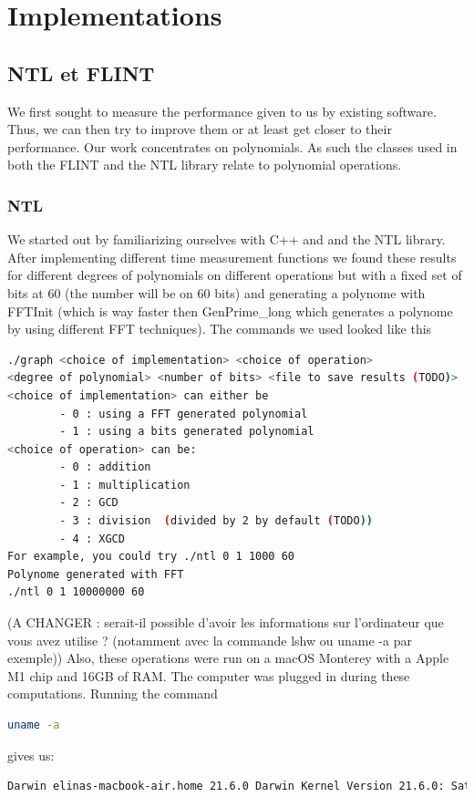 \newpage
\section{Implementations}
\subsection{NTL et FLINT}
We first sought to measure the performance given to us by existing software. Thus, we can then try to improve them or at least get closer to their performance.
Our work concentrates on polynomials. As such the classes used in both the FLINT and the NTL library relate to polynomial operations.
\subsubsection{NTL}

We started out by familiarizing ourselves with C++ and and the NTL library.
After implementing different time measurement functions we found these results for different degrees of polynomials on different operations but with a fixed set of bits at 60 (the number will be on 60 bits) and generating a polynome with FFTInit (which is way faster then GenPrime\_long which generates a polynome by using different FFT techniques).
The commands we used looked like this 
\begin{lstlisting}[language=bash]
./graph <choice of implementation> <choice of operation> 
<degree of polynomial> <number of bits> <file to save results (TODO)>
<choice of implementation> can either be
        - 0 : using a FFT generated polynomial
        - 1 : using a bits generated polynomial
<choice of operation> can be:
        - 0 : addition
        - 1 : multiplication
        - 2 : GCD
        - 3 : division  (divided by 2 by default (TODO))
        - 4 : XGCD 
For example, you could try ./ntl 0 1 1000 60
Polynome generated with FFT
./ntl 0 1 10000000 60
\end{lstlisting}

(A CHANGER : serait-il possible d'avoir les informations sur l'ordinateur que vous avez utilise ? (notamment avec la commande lshw ou uname -a par exemple))
Also, these operations were run on a macOS Monterey with a Apple M1 chip and 16GB of RAM. The computer was plugged in during these computations.
Running the command 
\begin{lstlisting}[language=bash]
uname -a 
\end{lstlisting}
gives us:
\begin{lstlisting}[language=bash]
Darwin elinas-macbook-air.home 21.6.0 Darwin Kernel Version 21.6.0: Sat Jun 18 17:05:47 PDT 2022; root:xnu-8020.140.41~1/RELEASE_ARM64_T8101 arm64
\end{lstlisting}

